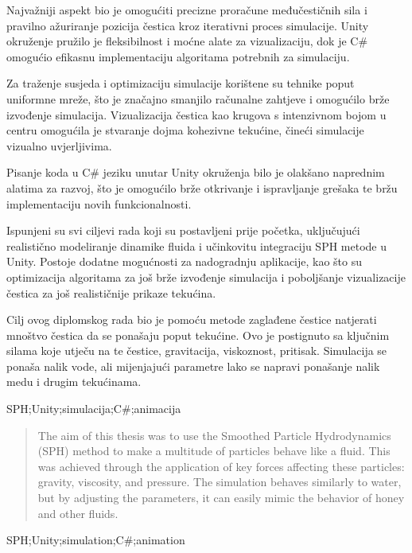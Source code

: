 \documentclass[diplomskirad]{fer}
\begin{document}
    Najvažniji aspekt bio je omogućiti precizne proračune međučestičnih sila i pravilno ažuriranje pozicija čestica kroz iterativni proces simulacije.
    Unity okruženje pružilo je fleksibilnost i moćne alate za vizualizaciju, dok je C# omogućio efikasnu implementaciju algoritama potrebnih za simulaciju.

    Za traženje susjeda i optimizaciju simulacije korištene su tehnike poput uniformne mreže, što je značajno smanjilo računalne zahtjeve i omogućilo brže izvođenje simulacija.
    Vizualizacija čestica kao krugova s intenzivnom bojom u centru omogućila je stvaranje dojma kohezivne tekućine, čineći simulacije vizualno uvjerljivima.

    Pisanje koda u C# jeziku unutar Unity okruženja bilo je olakšano naprednim alatima za razvoj, što je omogućilo brže otkrivanje i ispravljanje grešaka te bržu implementaciju novih funkcionalnosti.

    Ispunjeni su svi ciljevi rada koji su postavljeni prije početka, uključujući realistično modeliranje dinamike fluida i učinkovitu integraciju SPH metode u Unity.
    Postoje dodatne mogućnosti za nadogradnju aplikacije, kao što su optimizacija algoritama za još brže izvođenje simulacija i poboljšanje vizualizacije čestica za još realističnije prikaze tekućina.


    
    \begin{sazetak}
        Cilj ovog diplomskog rada bio je pomoću metode zaglađene čestice natjerati mnoštvo čestica da se ponašaju poput tekućine.
        Ovo je postignuto sa ključnim silama koje utječu na te čestice, gravitacija, viskoznost, pritisak.
        Simulacija se ponaša nalik vode, ali mijenjajući parametre lako se napravi ponašanje nalik medu i drugim tekućinama.
    \end{sazetak}
    \begin{kljucnerijeci}
        SPH;Unity;simulacija;C\#;animacija
    \end{kljucnerijeci}
    \begin{abstract}
        The aim of this thesis was to use the Smoothed Particle Hydrodynamics (SPH) method to make a multitude of particles behave like a fluid.
        This was achieved through the application of key forces affecting these particles: gravity, viscosity, and pressure.
        The simulation behaves similarly to water, but by adjusting the parameters, it can easily mimic the behavior of honey and other fluids.
    \end{abstract}
    \begin{keywords}
        SPH;Unity;simulation;C\#;animation
    \end{keywords}
\end{document}
